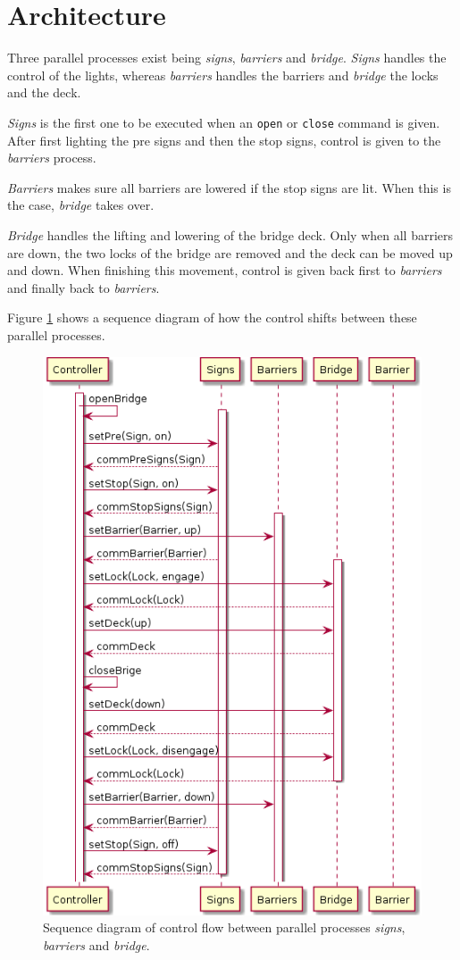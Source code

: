 \section{Architecture}
\label{sec:trans}

Three parallel processes exist being \emph{signs}, \emph{barriers} and \emph{bridge}. \emph{Signs} handles the control of the lights, whereas \emph{barriers} handles the barriers and \emph{bridge} the locks and the deck.

\emph{Signs} is the first one to be executed when an \texttt{open} or \texttt{close} command is given. After first lighting the pre signs and then the stop signs, control is given to the \emph{barriers} process.

\emph{Barriers} makes sure all barriers are lowered if the stop signs are lit. When this is the case, \emph{bridge} takes over.

\emph{Bridge} handles the lifting and lowering of the bridge deck. Only when all barriers are down, the two locks of the bridge are removed and the deck can be moved up and down. When finishing this movement, control is given back first to \emph{barriers} and finally back to \emph{barriers}.

Figure \ref{fig:arch} shows a sequence diagram of how the control shifts between these parallel processes.
%
\begin{figure}%
\centering
\includegraphics[width=0.5\columnwidth]{Architecture}%
\caption{Sequence diagram of control flow between parallel processes \emph{signs}, \emph{barriers} and \emph{bridge}.}%
\label{fig:arch}%
\end{figure}

